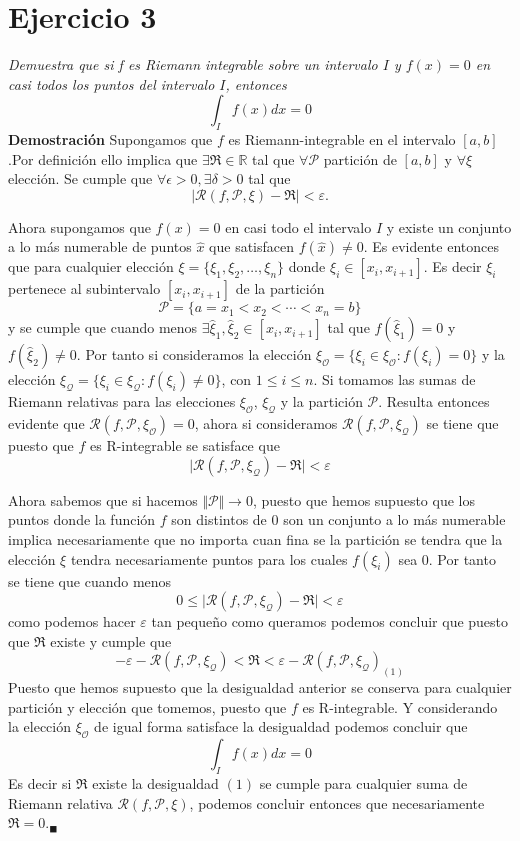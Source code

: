 \documentclass[a4paper,12pt]{article}
\begin{document}
\newpage
\section{Ejercicio 3}
\textit{Demuestra que si f es Riemann integrable sobre un intervalo $I$ y $f (x) = 0$ en casi todos los puntos del intervalo $I$,
entonces}
\[\int_{I} f(x) dx = 0\]
\textbf{Demostración}
Supongamos que $f$ es Riemann-integrable en el intervalo $[a,b]$.Por definición ello implica que $\exists \mathfrak{R} \in \mathbb{R}$
tal que $\forall \mathcal{P} $ partición de $[a,b]$ y $\forall \xi$ elección. Se cumple que $\forall \epsilon > 0, \exists \delta >0$
tal que
\[\vert \mathcal{R}(f,\mathcal{P},\xi) - \mathfrak{R} \vert < \varepsilon.\]

Ahora supongamos que $f(x) = 0$ en casi todo el intervalo $I$ y existe un conjunto a lo más numerable de puntos $\hat{x}$
que satisfacen $f(\hat{x}) \not = 0$. Es evidente entonces que para cualquier elección $\xi = \lbrace \xi_1, \xi_2, \ldots, \xi_n\rbrace$
donde $\xi_i \in [x_i,x_{i+1}]$.
Es decir $\xi_i$ pertenece al subintervalo $[x_i,x_{i+1}]$ de la partición
\[\mathcal{P} = \lbrace a = x_1 < x_2 < \cdots < x_n = b\rbrace\]
y se cumple que cuando menos $\exists \hat{\xi}_1 , \hat{\xi}_2 \in [x_i,x_{i+1}]$ tal que $f(\hat{\xi}_1) = 0$  y
$f(\hat{\xi}_2) \not = 0$.
Por tanto si consideramos la elección $\xi_{\mathcal{O} } = \lbrace \xi_i \in \xi_{\mathcal{O}} : f(\xi_i) = 0\rbrace$
y la elección  $\xi_{\mathcal{Q}} = \lbrace \xi_i \in \xi_{\mathcal{Q}} : f(\xi_i) \not = 0\rbrace$, con $1 \leq i \leq n$.
Si tomamos las sumas de Riemann relativas para las elecciones $\xi_{\mathcal{O}}$,  $\xi_{\mathcal{Q}}$ y la partición $\mathcal{P}$.
Resulta entonces evidente que $\mathcal{R} (f,\mathcal{P},\xi_{\mathcal{O}}) = 0$, ahora si consideramos
$\mathcal{R} (f,\mathcal{P},\xi_{\mathcal{Q}})$ se tiene que puesto que $f$ es R-integrable se satisface que
\[\vert \mathcal{R} (f,\mathcal{P},\xi_{\mathcal{Q}}) - \mathfrak{R} \vert < \varepsilon\]

Ahora sabemos que si hacemos $\Vert \mathcal{P} \Vert \rightarrow 0$, puesto que hemos supuesto que los puntos donde la
función $f$ son  distintos de 0 son un conjunto a lo más numerable implica necesariamente que no importa cuan fina se la
partición se tendra que la elección $\xi$ tendra necesariamente puntos para los cuales $f(\xi_i)$ sea 0. Por tanto se tiene
que cuando menos
\[0 \leq \vert \mathcal{R} (f,\mathcal{P},\xi_{\mathcal{Q}}) - \mathfrak{R} \vert < \varepsilon \]
como podemos hacer $\varepsilon$ tan pequeño como queramos podemos concluir que puesto que $\mathfrak{R}$ existe y cumple
que
\[-\varepsilon - \mathcal{R} (f,\mathcal{P},\xi_{\mathcal{Q}}) <  \mathfrak{R}  < \varepsilon - {\mathcal{R} (f,\mathcal{P},\xi_{\mathcal{Q}})}_{(1)}\]
Puesto que hemos supuesto que la desigualdad anterior se conserva para cualquier partición y elección que tomemos, puesto
que $f$ es R-integrable. Y considerando la elección $\xi_{\mathcal{O}}$ de igual forma satisface la desigualdad podemos
concluir que
\[\int_{I} f(x) dx = 0\]
Es decir si $\mathfrak{R}$ existe la desigualdad $(1)$ se cumple para cualquier suma de Riemann relativa $\mathcal{R} (f,\mathcal{P},\xi)$,
podemos concluir entonces que necesariamente $\mathfrak{R} = 0._\blacksquare$
\newpage
\end{document}

